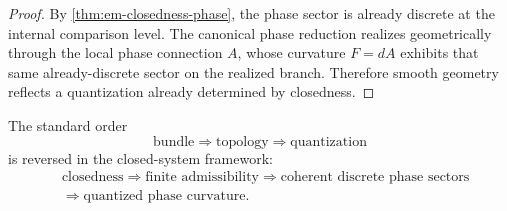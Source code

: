 \begin{proof}
	By \cref{thm:em-closedness-phase}, the phase sector is already discrete
	at the internal comparison level.
	The canonical phase reduction realizes geometrically through the local
	phase connection \(A\), whose curvature \(F=dA\) exhibits that same
	already-discrete sector on the realized branch.
	Therefore smooth geometry reflects a quantization already determined by
	closedness.
\end{proof}
\begin{remark}
	The standard order
	\[
		\text{bundle}
		\Longrightarrow
		\text{topology}
		\Longrightarrow
		\text{quantization}
	\]
	is reversed in the closed-system framework:
	\[
		\begin{aligned}
			 & \text{closedness}
			\Longrightarrow
			\text{finite admissibility}
			\Longrightarrow
			\text{coherent discrete phase sectors}
			\\
			 & \Longrightarrow
			\text{quantized phase curvature}.
		\end{aligned}
	\]
\end{remark}

